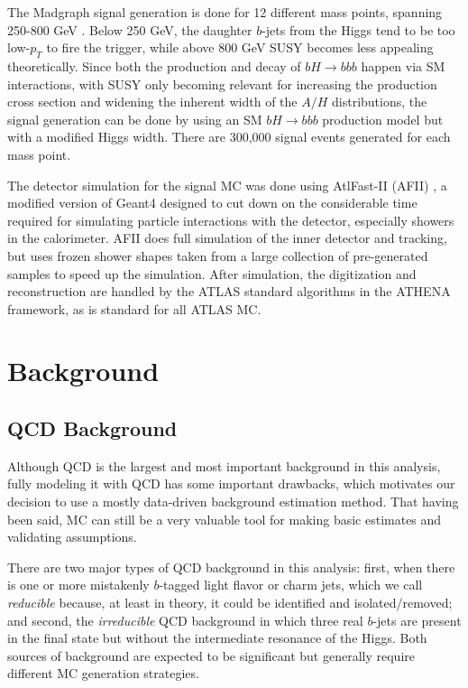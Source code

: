 



The Madgraph signal generation is done for 12 different mass points, spanning 250-800 GeV
. Below 250 GeV, the daughter $b$-jets from the Higgs tend to be 
too low-$p_T$ to fire the trigger, while above 800 GeV SUSY 
becomes less appealing theoretically.  Since both the production and decay of $bH\rightarrow bbb$ 
happen via SM interactions, with SUSY only becoming relevant for increasing the production cross section and 
widening the inherent width of the $A/H$ distributions, the signal generation can 
be done by using an SM $bH\rightarrow bbb$ production model but with a 
modified Higgs width.  There are 300,000 signal events generated for each mass point.

The detector simulation for the signal MC was done using AtlFast-II (AFII) \cite{ATF2}, 
a modified version of Geant4 \cite{Geant4-1, Geant4-2} designed 
to cut down on the considerable time required for simulating particle interactions with the detector, especially 
showers in the calorimeter.  AFII does full simulation of the inner detector and tracking, but 
uses frozen shower shapes taken from a large collection of pre-generated samples to speed up 
the simulation.  After simulation, the digitization and reconstruction are handled by the ATLAS standard algorithms 
in the ATHENA framework, as is standard for all ATLAS MC.    

\section{Background}
\subsection{QCD Background}
Although QCD is the largest and most important background in this analysis, fully modeling 
it with QCD has some important drawbacks, which motivates our decision to use a 
mostly data-driven background estimation method.  That having been said, MC can 
still be a very valuable tool for making basic estimates and validating assumptions. 

There are two major types of QCD background in this analysis: first, when 
there is one or more mistakenly $b$-tagged light flavor or charm jets, 
which we call \textit{reducible} because, at least in theory, 
it could be identified and isolated/removed; and second, the \textit{irreducible} 
QCD background in which three real $b$-jets are present in the final 
state but without the intermediate resonance of the Higgs.  Both sources of background are 
expected to be significant but generally require different MC generation strategies.




